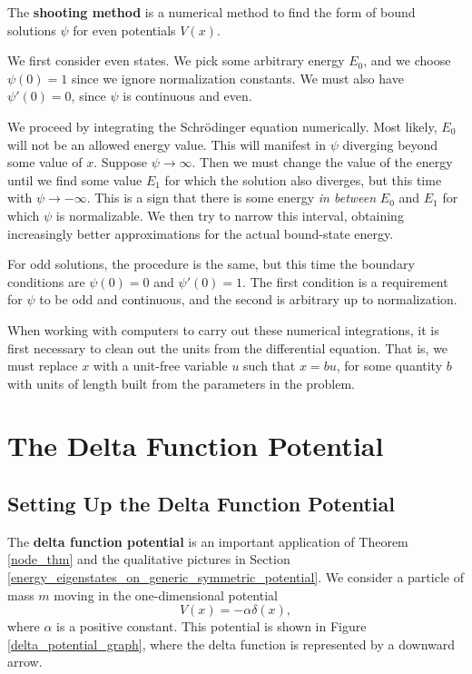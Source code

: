 The \textbf{shooting method} is a numerical method to find the form of bound solutions $\psi$ for even potentials $V(x)$. 

We first consider even states. We pick some arbitrary energy $E_0$, and we choose $\psi(0)=1$ since we ignore normalization constants. We must also have $\psi'(0)=0$, since $\psi$ is continuous and even. 

We proceed by integrating the Schrödinger equation numerically. Most likely, $E_0$ will not be an allowed energy value. This will manifest in $\psi$ diverging beyond some value of $x$. Suppose $\psi\rightarrow\infty$. Then we must change the value of the energy until we find some value $E_1$ for which the solution also diverges, but this time with $\psi\rightarrow-\infty$. This is a sign that there is some energy \textit{in between} $E_0$ and $E_1$ for which $\psi$ is normalizable. We then try to narrow this interval, obtaining increasingly better approximations for the actual bound-state energy.

For odd solutions, the procedure is the same, but this time the boundary conditions are $\psi(0)=0$ and $\psi'(0)=1$. The first condition is a requirement for $\psi$ to be odd and continuous, and the second is arbitrary up to normalization.

\begin{framedrmk*}
    When working with computers to carry out these numerical integrations, it is first necessary to clean out the units from the differential equation. That is, we must replace $x$ with a unit-free variable $u$ such that $x=bu$, for some quantity $b$ with units of length built from the parameters in the problem.
\end{framedrmk*}

\section{The Delta Function Potential}

\subsection{Setting Up the Delta Function Potential}\label{setting_up_delta_function}

The \textbf{delta function potential} is an important application of Theorem \ref{node_thm} and the qualitative pictures in Section \ref{energy_eigenstates_on_generic_symmetric_potential}. We consider a particle of mass $m$ moving in the one-dimensional potential $$V(x)=-\alpha\delta(x),$$where $\alpha$ is a positive constant. This potential is shown in Figure \ref{delta_potential_graph}, where the delta function is represented by a downward arrow.

